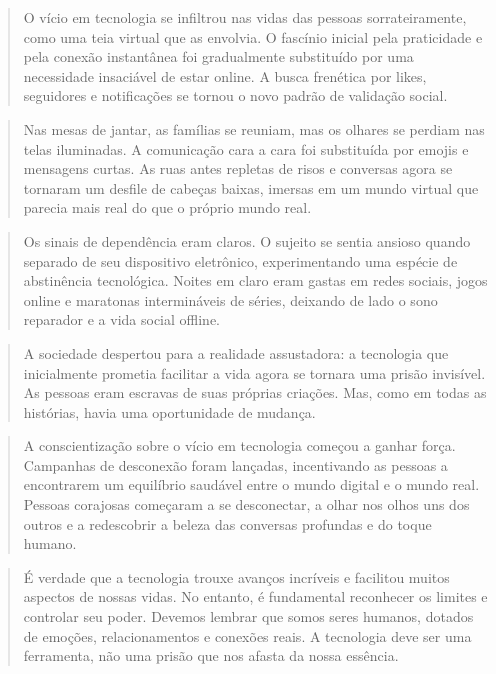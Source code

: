 {\begin{quote}
O vício em tecnologia se infiltrou nas vidas das pessoas
sorrateiramente, como uma teia virtual que as envolvia. O fascínio
inicial pela praticidade e pela conexão instantânea foi gradualmente
substituído por uma necessidade insaciável de estar online. A busca
frenética por likes, seguidores e notificações se tornou o novo padrão
de validação social.
\end{quote}

\begin{quote}
Nas mesas de jantar, as famílias se reuniam, mas os olhares se perdiam
nas telas iluminadas. A comunicação cara a cara foi substituída por
emojis e mensagens curtas. As ruas antes repletas de risos e conversas
agora se tornaram um desfile de cabeças baixas, imersas em um mundo
virtual que parecia mais real do que o próprio mundo real.
\end{quote}

\begin{quote}
Os sinais de dependência eram claros. O sujeito se sentia ansioso quando
separado de seu dispositivo eletrônico, experimentando uma espécie de
abstinência tecnológica. Noites em claro eram gastas em redes sociais,
jogos online e maratonas intermináveis de séries, deixando de lado o
sono reparador e a vida social offline.
\end{quote}

\begin{quote}
A sociedade despertou para a realidade assustadora: a tecnologia que
inicialmente prometia facilitar a vida agora se tornara uma prisão
invisível. As pessoas eram escravas de suas próprias criações. Mas, como
em todas as histórias, havia uma oportunidade de mudança.
\end{quote}

\begin{quote}
A conscientização sobre o vício em tecnologia começou a ganhar força.
Campanhas de desconexão foram lançadas, incentivando as pessoas a
encontrarem um equilíbrio saudável entre o mundo digital e o mundo real.
Pessoas corajosas começaram a se desconectar, a olhar nos olhos uns dos
outros e a redescobrir a beleza das conversas profundas e do toque
humano.
\end{quote}

\begin{quote}
É verdade que a tecnologia trouxe avanços incríveis e facilitou muitos
aspectos de nossas vidas. No entanto, é fundamental reconhecer os
limites e controlar seu poder. Devemos lembrar que somos seres humanos,
dotados de emoções, relacionamentos e conexões reais. A tecnologia deve
ser uma ferramenta, não uma prisão que nos afasta da nossa essência.
\end{quote}

}
